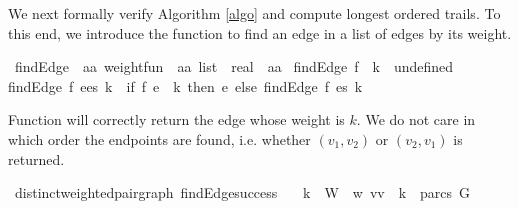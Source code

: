 \begin{isabellebody}
%
\isadelimproof
%
\endisadelimproof
%
\isadelimproof
%
\endisadelimproof
%
\isatagproof
%
\endisatagproof
{\isafoldproof}%
%
\isadelimproof
%
\endisadelimproof
%
\isadelimproof
%
\endisadelimproof
%
\isatagproof
%
\endisatagproof
{\isafoldproof}%
%
\isadelimproof
%
\endisadelimproof
%
\isadelimdocument
%
\endisadelimdocument
%
\isatagdocument
%
\isamarkuptrue%
%
\endisatagdocument
{\isafolddocument}%
%
\isadelimdocument
%
\endisadelimdocument
%
\begin{isamarkuptext}%
\label{compAlgo}We next formally verify Algorithm \ref{algo} and compute longest ordered trails. To this end, 
we introduce the function  to find an edge in a list of edges by its weight.%
\end{isamarkuptext}\isamarkuptrue%
\isamarkupfalse%
\ findEdge\ {\isacharcolon}{\isacharcolon}\ {\isachardoublequoteopen}{\isacharparenleft}{\isacharprime}a{\isasymtimes}{\isacharprime}a{\isacharparenright}\ weight{\isacharunderscore}fun\ {\isasymRightarrow}\ {\isacharparenleft}{\isacharprime}a{\isasymtimes}{\isacharprime}a{\isacharparenright}\ list\ {\isasymRightarrow}\ real\ {\isasymRightarrow}\ {\isacharparenleft}{\isacharprime}a{\isasymtimes}{\isacharprime}a{\isacharparenright}{\isachardoublequoteclose}\ \isanewline
{\isachardoublequoteopen}findEdge\ f\ {\isacharbrackleft}{\isacharbrackright}\ k\ {\isacharequal}\ undefined{\isachardoublequoteclose}\ {\isacharbar}\isanewline
{\isachardoublequoteopen}findEdge\ f\ {\isacharparenleft}e{\isacharhash}es{\isacharparenright}\ k\ {\isacharequal}\ {\isacharparenleft}if\ f\ e\ {\isacharequal}\ k\ then\ e\ else\ findEdge\ f\ es\ k{\isacharparenright}{\isachardoublequoteclose}\ \isanewline
%
\isadelimproof
%
\endisadelimproof
%
\isatagproof
%
\endisatagproof
{\isafoldproof}%
%
\isadelimproof
%
\endisadelimproof
%
\begin{isamarkuptext}%
Function  will correctly return the edge whose weight is $k$. We do not care in which order the endpoints
are found, i.e. whether $(v_1,v_2)$ or $(v_2,v_1)$ is returned.%
\end{isamarkuptext}\isamarkuptrue%
\isamarkupfalse%
{\isacharparenleft}\ distinct{\isacharunderscore}weighted{\isacharunderscore}pair{\isacharunderscore}graph{\isacharparenright}\ findEdge{\isacharunderscore}success{\isacharcolon}\isanewline
\ \ \ {\isachardoublequoteopen}k\ {\isasymin}\ W{\isachardoublequoteclose}\ \ {\isachardoublequoteopen}w\ {\isacharparenleft}vv\ {\isacharequal}\ k{\isachardoublequoteclose}\ \ {\isachardoublequoteopen}{\isacharparenleft}parcs\ G{\isacharparenright}\ {\isasymnoteq}\ {\isacharbraceleft}{\isacharbraceright}{\isachardoublequoteclose}\ \isanewline

\end{isabellebody}
